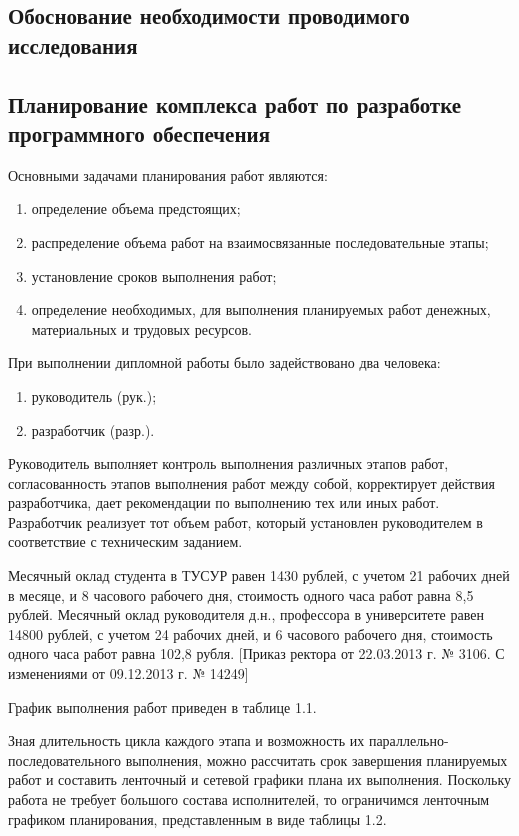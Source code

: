 \subsection{Обоснование необходимости проводимого исследования}

\subsection{Планирование комплекса работ по разработке программного обеспечения}
Основными задачами планирования работ являются:
\begin{enumerate}
\item определение объема предстоящих;
\item распределение объема работ на взаимосвязанные последовательные этапы;
\item установление сроков выполнения работ;
\item определение необходимых, для выполнения планируемых работ денежных, материальных и трудовых ресурсов.
\end{enumerate}
При выполнении дипломной работы было задействовано два человека:
\begin{enumerate}
\item руководитель (рук.);
\item разработчик (разр.).
\end{enumerate}
Руководитель выполняет контроль выполнения различных этапов работ, согласованность этапов выполнения работ между собой, корректирует действия разработчика, дает рекомендации по выполнению тех или иных работ. Разработчик реализует тот объем работ, который установлен руководителем в соответствие с техническим заданием.

Месячный оклад студента в ТУСУР равен 1430 рублей, с учетом 21 рабочих дней в месяце, и 8 часового рабочего дня, стоимость одного часа работ равна 8,5 рублей. Месячный оклад руководителя д.н., профессора в университете равен 14800 рублей, с учетом 24 рабочих дней, и 6 часового рабочего дня, стоимость одного часа работ равна 102,8 рубля. [Приказ ректора от 22.03.2013 г. № 3106. С изменениями от 09.12.2013 г. № 14249]

График выполнения работ приведен в таблице 1.1.

Зная длительность цикла каждого этапа и возможность их параллельно-последовательного выполнения, можно рассчитать срок завершения планируемых работ и составить ленточный и сетевой графики плана их выполнения. Поскольку работа не требует большого состава исполнителей, то ограничимся ленточным графиком планирования, представленным в виде таблицы 1.2.

